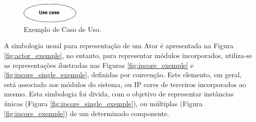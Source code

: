 \documentclass{article}
\begin{document}
  \FloatBarrier
  \begin{figure}[H]
    \centering
    \includegraphics[width=0.25\textwidth]{uc_exemple.png}
    \caption{Exemplo de Caso de Uso.}
    \label{fig:uc_exemple}
  \end{figure}
  
  A simbologia usual para representação de um Ator é apresentada na Figura \ref{fig:actor_exemple}, no entanto, para representar módulos incorporados, utiliza-se as representações ilustradas nas Figuras \ref{fig:ipcore_exemple} e \ref{fig:ipcore_single_exemple}, definidas por convenção. Este elemento, em geral, está associado aos módulos do sistema, ou IP cores de terceiros incorporados ao mesmo. Esta simbologia foi divida, com o objetivo de representar instâncias únicas (Figura \ref{fig:ipcore_single_exemple}), ou múltiplas (Figura \ref{fig:ipcore_exemple}) de um determinado componente. 
  
\end{document}
